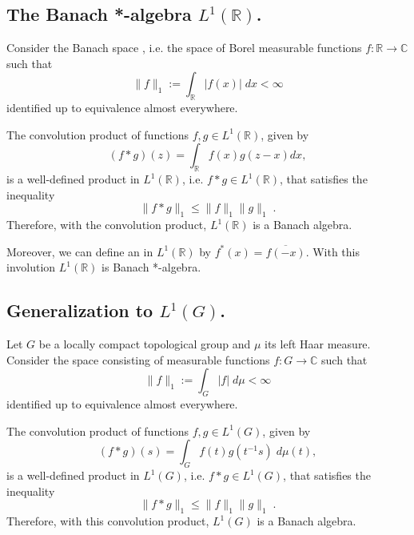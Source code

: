 \documentclass[12pt]{article}
\begin{document}

\subsection{The Banach *-algebra $L^1(\mathbb{R})$.}

Consider the Banach space , i.e. the space of Borel measurable functions $f:\mathbb{R} \longrightarrow \mathbb{C}$ such that
\begin{displaymath}
\|f\|_1 := \int_{\mathbb{R}} |f(x)|\; dx < \infty
\end{displaymath}
identified up to equivalence almost everywhere.

The convolution product of functions $f, g \in L^1(\mathbb{R})$, given by
\begin{displaymath}
(f * g)(z) = \int_{\mathbb{R}} f(x)g(z-x)dx ,
\end{displaymath}
is a well-defined product in $L^1(\mathbb{R})$, i.e. $f*g \in L^1(\mathbb{R})$, that satisfies the inequality
\begin{displaymath}
\|f*g\|_1 \leq \|f\|_1\|g\|_1\;.
\end{displaymath}
Therefore, with the convolution product, $L^1(\mathbb{R})$ is a Banach algebra.

Moreover, we can define an  in $L^1(\mathbb{R})$ by $f^*(x)=\overline{f(-x)}$. With this involution $L^1(\mathbb{R})$ is Banach *-algebra.

\subsection{Generalization to $L^1(G)$.}
Let $G$ be a locally compact topological group and $\mu$ its left Haar measure. Consider the space  consisting of measurable functions $f:G \longrightarrow \mathbb{C}$ such that
\begin{displaymath}
\|f\|_1 := \int_G |f|\; d\mu < \infty
\end{displaymath}
identified up to equivalence almost everywhere.

The convolution product of functions $f, g \in L^1(G)$, given by
\begin{displaymath}
(f * g)(s) = \int_G f(t)g(t^{-1}s)\;d\mu(t) ,
\end{displaymath}
is a well-defined product in $L^1(G)$, i.e. $f*g \in L^1(G)$, that satisfies the inequality
\begin{displaymath}
\|f*g\|_1 \leq \|f\|_1\|g\|_1\;.
\end{displaymath}
Therefore, with this convolution product, $L^1(G)$ is a Banach algebra.
\end{document}
